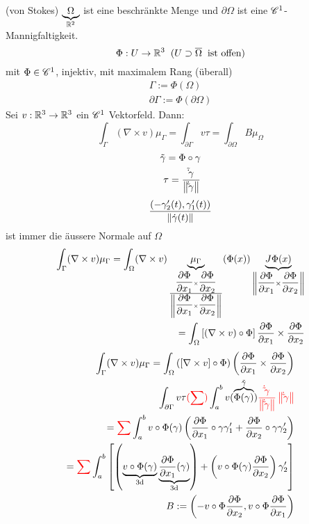 \begin{Sat} (von Stokes)
  $\underbrace{\Omega}_{\mathbb{R}^{2}}$ ist eine beschränkte Menge und $\partial\Omega$ ist eine $\mathscr{C}^1$-Mannigfaltigkeit.
  \[\Phi:U\rightarrow\mathbb{R}^3\hspace{2mm} (U\supset\overline{\Omega}\hspace{2mm}\text{ist offen})\]
  mit $\Phi\in\mathscr{C}^1$, injektiv, mit maximalem Rang (überall)
  \begin{eqnarray*}
    \Gamma:=\Phi(\Omega)\\
    \partial\Gamma:=\Phi(\partial\Omega)
  \end{eqnarray*}
  Sei $v:\mathbb{R}^3\rightarrow\mathbb{R}^3$ ein $\mathscr{C}^1$ Vektorfeld. Dann:
  \[\int_\Gamma(\nabla\times v)\mu_\Gamma=\int_{\partial\Gamma}v\tau=\int_{\partial\Omega}B\mu_\Omega\]
  \begin{eqnarray*}
    \tilde\gamma=\Phi\circ\gamma\\
    \tau=\frac{\tilde\dot\gamma}{\left\| \dot\tilde\gamma \right\|}
  \end{eqnarray*}
  \[\frac{(-\gamma_2'(t),\gamma_1'(t))}{\left\| \dot\gamma(t) \right\|}\]
  ist immer die äussere Normale auf $\Omega$
  \begin{eqnarray*}
    \int_\Gamma(\nabla\times v)\mu_\Gamma=\int_\Omega(\nabla\times v)\underbrace{\mu_\Gamma}_{\frac{\Part{\Phi}{x_1}\times\Part{\Phi}{x_2}}{\Norm{\Part{\Phi}{x_1}\times\Part{\Phi}{x_2}}}}(\Phi(x)) \underbrace{J\Phi(x)}_{\Norm{\Part{\Phi}{x_1}\times\Part{\Phi}{x_2}}}\\
    = \int_\Omega \left[ (\nabla\times v)\circ\Phi \right]\Part{\Phi}{x_1}\times\Part{\Phi}{x_2}\\ %
  \end{eqnarray*}
  \begin{eqnarray*}
    \int_\Gamma(\nabla\times v)\mu_\Gamma=\int_\Omega\left( \left[ \nabla\times v \right]\circ\Phi \right)\left( \Part{\Phi}{x_1}\times\Part{\Phi}{x_2} \right)\\
    \int_{\partial\Gamma}v\tau{\color{red}(\sum)}\int_a^bv(\overbrace{\Phi(\gamma)}^{\tilde\gamma}){\color{red}\frac{\dot\tilde\gamma}{\Norm{\dot\tilde\gamma}}\Norm{\dot\tilde\gamma}}\\
    ={\color{red}\sum}\int_a^bv\circ\Phi(\gamma)\left( \Part{\Phi}{x_1}\circ\gamma\gamma_1'+\Part{\Phi}{x_2}\circ\gamma\gamma_2' \right)\\
    ={\color{red}\sum}\int_a^b\left[ \left( \underbrace{v\circ\Phi(\gamma)}_{\text{3d}}\underbrace{\Part{\Phi}{x_1}(\gamma)}_{\text{3d}} \right)+\left( v\circ\Phi(\gamma)\Part{\Phi}{x_2} \right)\gamma_2' \right]\\
    B:=\left(-v\circ\Phi\Part{\Phi}{x_2}, v\circ\Phi\Part{\Phi}{x_1}\right)\\

\end{eqnarray*}
\end{Sat}
